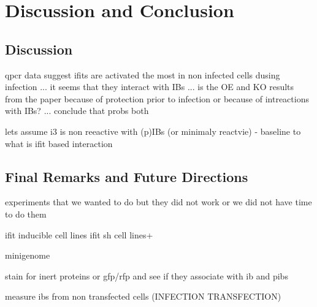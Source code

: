 \chapter{Discussion and Conclusion}
\section{Discussion}

qpcr data suggest ifits are activated the most in non infected cells dusing infection ... it seems that they interact with IBs ... is the OE and KO results from the paper because of protection prior to infection or because of intreactions with IBs? ... conclude that probs both


lets assume i3 is non reeactive with (p)IBs (or minimaly reactvie) - baseline to what is ifit based interaction

\section{Final Remarks and Future Directions}
experiments that we wanted to do but they did not work or we did not have time to do them

ifit inducible cell lines
ifit sh cell lines+

minigenome

stain for inert proteins or gfp/rfp and see if they associate with ib and pibs

measure ibs from non transfected cells (INFECTION TRANSFECTION)




